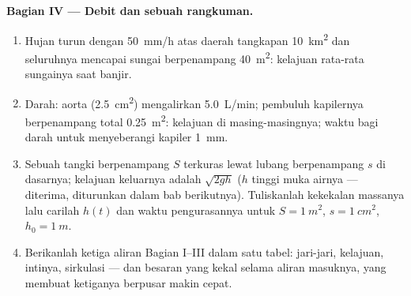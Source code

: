 \begin{problem}
\medskip
\noindent\textbf{Bagian IV --- Debit dan sebuah rangkuman.}
\begin{enumerate}[resume]
  \item Hujan turun dengan \qty{50}{mm/h} atas daerah tangkapan
        \qty{10}{km^2} dan seluruhnya mencapai sungai berpenampang
        \qty{40}{m^2}: kelajuan rata-rata sungainya saat banjir.
  \item Darah: aorta (\qty{2.5}{cm^2}) mengalirkan \qty{5.0}{L/min};
        pembuluh kapilernya berpenampang total \qty{0.25}{m^2}:
        kelajuan di masing-masingnya; waktu bagi darah untuk
        menyeberangi kapiler \qty{1}{mm}.
  \item Sebuah tangki berpenampang $S$ terkuras lewat lubang
        berpenampang $s$ di dasarnya; kelajuan keluarnya adalah
        $\sqrt{2gh}$ ($h$ tinggi muka airnya --- diterima, diturunkan
        dalam bab berikutnya). Tuliskanlah kekekalan massanya lalu
        carilah $h(t)$ dan waktu pengurasannya untuk
        $S = \qty{1}{m^2}$, $s = \qty{1}{cm^2}$, $h_0 = \qty{1}{m}$.
  \item Berikanlah ketiga aliran Bagian I--III dalam satu tabel:
        jari-jari, kelajuan,  intinya, sirkulasi --- dan
        besaran yang kekal selama aliran masuknya, yang membuat
        ketiganya berpusar makin cepat.
\end{enumerate}
\end{problem}
